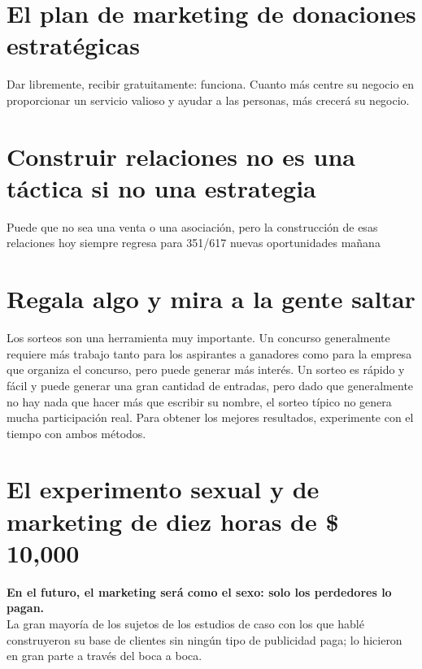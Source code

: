 \documentclass[10pt]{book}
\begin{document}
	\section{El plan de marketing de donaciones estratégicas}
	    Dar libremente, recibir gratuitamente: funciona. Cuanto más centre su negocio en proporcionar un servicio valioso y ayudar a las personas, más crecerá su negocio.

	\section{Construir relaciones no es una táctica si no una estrategia}
	    Puede que no sea una venta o una asociación, pero la construcción de esas relaciones hoy siempre regresa para 351/617 nuevas oportunidades mañana

	\section{Regala algo y mira a la gente saltar}
	    Los sorteos son una herramienta muy importante. Un concurso generalmente requiere más trabajo tanto para los aspirantes a ganadores como para la empresa que organiza el concurso, pero puede generar más interés. Un sorteo es rápido y fácil y puede generar una gran cantidad de entradas, pero dado que generalmente no hay nada que hacer más que escribir su nombre, el sorteo típico no genera mucha participación real. Para obtener los mejores resultados, experimente con el tiempo con ambos métodos.

	\section{El experimento sexual y de marketing de diez horas de \$ 10,000}
	\textbf{En el futuro, el marketing será como el sexo: solo los perdedores lo pagan.}\\
	La gran mayoría de los sujetos de los estudios de caso con los que hablé construyeron su base de clientes sin ningún tipo de publicidad paga; lo hicieron en gran parte a través del boca a boca.
\end{document}
